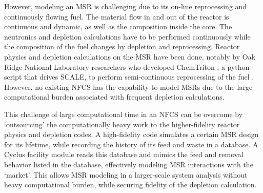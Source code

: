 However, modeling an \gls{MSR} is challenging due to its on-line reprocessing
and continuously flowing fuel.
The material flow in and out of the reactor is continuous and dynamic, as well as the
composition inside the core.
The neutronics and depletion calculations have to be performed continuously while
the composition of the fuel changes by depletion and reprocessing.
Reactor physics and depletion calculations
on the \gls{MSR} have been done, notably by 
 Oak Ridge National Laboratory researchers who developed
ChemTriton \cite{powers_new_2013}, a python script that drives SCALE,
to perform semi-continuous reprocessing of the fuel \cite{powers_inventory_2014, betzler_fuel_2018}.
However, no existing \gls{NFCS} has the capability to model \glspl{MSR}
due to the large computational burden associated with frequent depletion calculations.

This challenge of large computational time in an \gls{NFCS} can be overcome by `outsourcing' the computationally
heavy work to the higher-fidelity reactor physics and depletion codes. 
A high-fidelity code simulates a certain
\gls{MSR} design for its lifetime, while recording the history of its feed and waste in a
database. A Cyclus facility module reads this database and mimics the feed and removal
behavior listed in the database, effectively modeling \gls{MSR} interactions with the `market'.
This allows \gls{MSR} modeling in a larger-scale system analysis without heavy computational
burden, while securing fidelity of the depletion calculation.